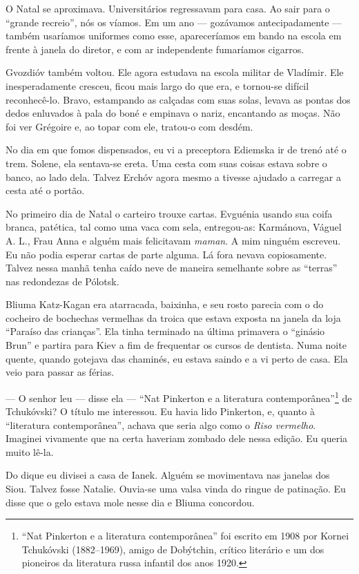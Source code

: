 O Natal se aproximava. Universitários regressavam para casa. Ao sair
para o ``grande recreio'', nós os víamos. Em um ano --- gozávamos
antecipadamente --- também usaríamos uniformes como esse, apareceríamos
em bando na escola em frente à janela do diretor, e com ar independente
fumaríamos cigarros.

Gvozdióv também voltou. Ele agora estudava na escola militar de
Vladímir. Ele inesperadamente cresceu, ficou mais largo do que era, e
tornou-se difícil reconhecê-lo. Bravo, estampando as calçadas com suas
solas, levava as pontas dos dedos enluvados à pala do boné e empinava o
nariz, encantando as moças. Não foi ver Grégoire e, ao topar com ele,
tratou-o com desdém.

No dia em que fomos dispensados, eu vi a preceptora Ediemska ir de trenó
até o trem. Solene, ela sentava-se ereta. Uma cesta com suas coisas
estava sobre o banco, ao lado dela. Talvez Erchóv agora mesmo a tivesse
ajudado a carregar a cesta até o portão.

No primeiro dia de Natal o carteiro trouxe cartas. Evguénia usando sua
coifa branca, patética, tal como uma vaca com sela, entregou-as:
Karmánova, Váguel A. L., Frau Anna e alguém mais felicitavam
\emph{maman}. A mim ninguém escreveu. Eu não podia esperar cartas de
parte alguma. Lá fora nevava copiosamente. Talvez nessa manhã tenha
caído neve de maneira semelhante sobre as ``terras'' nas redondezas de
Pólotsk.

Bliuma Katz-Kagan era atarracada, baixinha, e seu rosto parecia com o do
cocheiro de bochechas vermelhas da troica que estava exposta na janela
da loja ``Paraíso das crianças''. Ela tinha terminado na última
primavera o ``ginásio Brun'' e partira para Kiev a fim de frequentar os
cursos de dentista. Numa noite quente, quando gotejava das chaminés, eu
estava saindo e a vi perto de casa. Ela veio para passar as férias.

--- O senhor leu --- disse ela --- ``Nat Pinkerton e a literatura
contemporânea''\footnote{``Nat Pinkerton e a literatura contemporânea''
  foi escrito em 1908 por Kornei Tchukóvski (1882--1969), amigo de
  Dobýtchin, crítico literário e um dos pioneiros da literatura russa
  infantil dos anos 1920.} de Tchukóvski? O título me interessou. Eu
havia lido Pinkerton, e, quanto à ``literatura contemporânea'', achava
que seria algo como o \emph{Riso vermelho}. Imaginei vivamente que na
certa haveriam zombado dele nessa edição. Eu queria muito lê-la.

Do dique eu divisei a casa de Ianek. Alguém se movimentava nas janelas
dos Siou. Talvez fosse Natalie. Ouvia-se uma valsa vinda do ringue de
patinação. Eu disse que o gelo estava mole nesse dia e Bliuma concordou.

